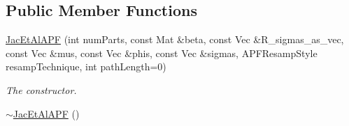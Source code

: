 \subsection*{Public Member Functions}
\begin{DoxyCompactItemize}
\item 
\hyperlink{classJacEtAlAPF_ac410fda3eb39aea5703740ca75276938}{Jac\+Et\+Al\+A\+PF} (int num\+Parts, const Mat \&beta, const Vec \&R\+\_\+sigmas\+\_\+as\+\_\+vec, const Vec \&mus, const Vec \&phis, const Vec \&sigmas, A\+P\+F\+Resamp\+Style resamp\+Technique, int path\+Length=0)
\begin{DoxyCompactList}\small\item\em The constructor. \end{DoxyCompactList}\item 
\hyperlink{classJacEtAlAPF_ae601f6fd2c95012e54fabfc4072c91dd}{$\sim$\+Jac\+Et\+Al\+A\+PF} ()\hypertarget{classJacEtAlAPF_ae601f6fd2c95012e54fabfc4072c91dd}{}\label{classJacEtAlAPF_ae601f6fd2c95012e54fabfc4072c91dd}


\end{DoxyCompactItemize}
